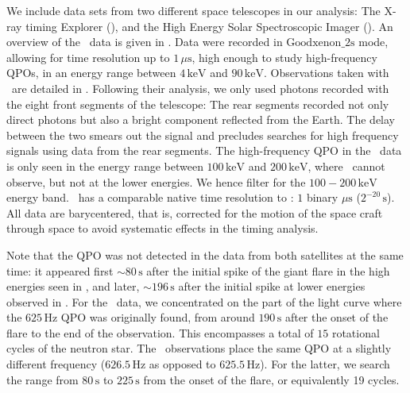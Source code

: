\documentclass{emulateapj}
\begin{document}
We include data sets from two different space telescopes in our analysis: The  X-ray timing Explorer (\rxte), and the  High Energy Solar Spectroscopic Imager (\rhessi). An overview of the \rxte\ data is given in \citet{Israel05}. Data were recorded in $\mathrm{Goodxenon\_2s}$ mode, allowing for time resolution up to $1 \, \mu \mathrm{s}$, high enough to study high-frequency QPOs, in an energy range between $4 \, \mathrm{keV}$ and $90 \, \mathrm{keV}$.
Observations taken with \rhessi\ are detailed in \citet{Watts06}. Following their analysis, we only used photons recorded with the eight front segments of the telescope: The rear segments recorded not only direct photons but also a bright component reflected from the Earth. The delay between the two smears out the signal and precludes searches for high frequency signals using data from the rear segments. The high-frequency QPO in the \rhessi\ data is only seen in the energy range between $100 \, \mathrm{keV}$ and $200 \, \mathrm{keV}$, where \rxte\ cannot observe, but not at the lower energies. We hence filter for the $100 - 200 \, \mathrm{keV}$ energy band.  \rhessi\ has a comparable native time resolution to \rxte: $1$ binary $\mu\mathrm{s}$ ($2^{-20} \, \mathrm{s}$). All data are barycentered, that is, corrected for the motion of the space craft through space to avoid systematic effects in the timing analysis.

Note that the QPO was not detected in the data from both satellites at the same time: it appeared first $\sim\!\! 80\,\mathrm{s}$ after the initial spike of the giant flare in the high energies seen in \rhessi, and later, $\sim\!\! 196 \,\mathrm{s}$ after the initial spike at lower energies observed in \rxte.
For the \rxte\ data, we concentrated on the part of the light curve where the $625 \, \mathrm{Hz}$ QPO was originally found, from around $190\, \mathrm{s}$ after the onset of the flare to the end of the observation. This encompasses a total of $15$ rotational cycles of the neutron star. The \rhessi\ observations place the same QPO at a slightly different frequency ($626.5 \, \mathrm{Hz}$ as opposed to $625.5 \, \mathrm{Hz}$). For the latter, we search the range from $80\, \mathrm{s}$ to $225 \, \mathrm{s}$ from the onset of the flare, or equivalently 19 cycles.
\end{document}
